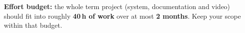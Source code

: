 \documentclass[11pt,a4paper]{article}
\begin{document}
\vspace{1em}
\begin{infobox}
\textbf{Effort budget:} the whole term project (system, documentation and video)
should fit into roughly \textbf{40\,h of work} over at most \textbf{2 months}.
Keep your scope within that budget.
\end{infobox}
\end{document}
